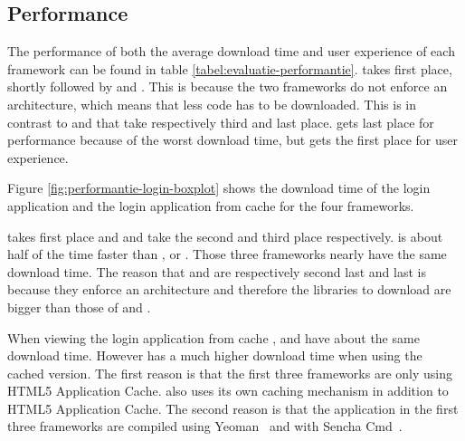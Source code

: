 \documentclass[a4paper]{artikel3}
\newcommand{\setspace}[0]{\vspace{2mm}}
\renewcommand{\paragraph}[1]{\setspace \noindent {\bf #1}  }
\begin{document}
\subsection{Performance} %
\label{sec:evaluation-performance}
The performance of both the average download time and user experience of each framework can be found in table \ref{tabel:evaluatie-performantie}.
\lungo{} takes first place, shortly followed by \jqma{} and \sta{}.
This is because the two frameworks do not enforce an architecture, which means that less \js{} code has to be downloaded.
This is in contrast to \kendoa{} and \sta{} that take respectively third  and last place.
\sta{} gets last place for performance because of the worst download time, but gets the first place for user experience.


\paragraph{Average download time}
Figure \ref{fig:performantie-login-boxplot} shows the download time of the login application and the login application from cache for the four frameworks. 

\lungo{} takes first place and \jqma{} and \kendoa{} take the second and third place respectively.
\lungo{} is about half of the time faster than \jqma{}, \kendoa{} or \sta{}.
Those three frameworks nearly have the same download time.
The reason that \kendoa{} and \sta{} are respectively second last and last is because they enforce an architecture and therefore the libraries to download are bigger than those of \lungo{} and \jqma{}.

When viewing the login application from cache \kendoa{}, \jqma{} and \lungo{} have about the same download time.
However \st{} has a much higher download time when using the cached version.
The first reason is that the first three frameworks are only using HTML5 Application Cache.
\sta{} also uses its own caching mechanism in addition to HTML5 Application Cache.
The second reason is that the application in the first three frameworks are compiled using Yeoman~\cite{Yeoman2013} and \st{} with Sencha Cmd~\cite{Sencha2012}.

\end{document}
